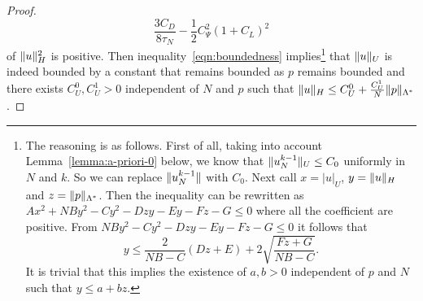 \documentclass[a4paper,10pt,oneside]{amsbook}
\numberwithin{section}{chapter}
\numberwithin{equation}{chapter}
\theoremstyle{definition}
\DeclarePairedDelimiter{\norm}{\lVert}{\rVert}
\begin{document}
\begin{proof}
\[
\frac{3C_D}{8\tau_N}-\frac{1}{2}C_{\Psi}^2(1+C_L)^2
\]
of $\norm{u}_H^2$ is positive. Then inequality~\eqref{eqn:boundedness} implies\footnote{The reasoning is as follows. First of all, taking into account Lemma~\ref{lemma:a-priori-0} below, we know that $\norm{u_N^{k-1}}_U\le C_0$ uniformly in $N$ and $k$. So we can replace $\norm{u_N^{k-1}}$ with $C_0$. Next call $x=|u|_U$, $y=\norm{u}_H$ and $z=\norm{p}_{\Lambda^*}$. Then the inequality can be rewritten as $Ax^2+NB y^2-Cy^2-Dzy-Ey-Fz-G\le0$ where all the coefficient are positive. From $NB y^2-Cy^2-Dzy-Ey-Fz-G\le0$ it follows that
\[
y\le\frac{2}{NB-C}(Dz+E)+2\sqrt{\frac{Fz+G}{NB-C}}.
\]
It is trivial that this implies the existence of $a,b>0$ independent of $p$ and $N$ such that $y\le a+bz$.} that $\norm{u}_U$ is indeed bounded by a constant that remains bounded as $p$ remains bounded and there exists $C_U^0,C_U^1>0$ independent of $N$ and $p$ such that $\norm{u}_H\le C_U^0+\frac{C_U^1}{N}\norm{p}_{\Lambda^*}$.


\end{proof}
\end{document}
